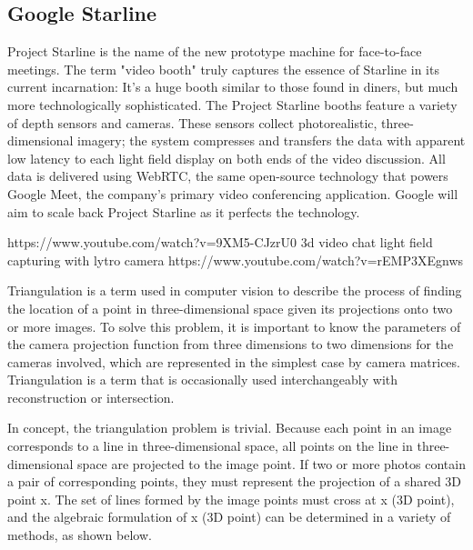  \subsection{Google Starline}\label{subsec2:google-starline}

Project Starline is the name of the new prototype machine for face-to-face meetings. The term "video booth" truly captures the essence of Starline in its current incarnation: It's a huge booth similar to those found in diners, but much more technologically sophisticated. The Project Starline booths feature a variety of depth sensors and cameras. These sensors collect photorealistic, three-dimensional imagery; the system compresses and transfers the data with apparent low latency to each light field display on both ends of the video discussion. All data is delivered using WebRTC, the same open-source technology that powers Google Meet, the company's primary video conferencing application. Google will aim to scale back Project Starline as it perfects the technology.

https://www.youtube.com/watch?v=9XM5-CJzrU0
3d video chat
light field capturing with lytro camera
https://www.youtube.com/watch?v=rEMP3XEgnws

Triangulation is a term used in computer vision to describe the process of finding the location of a point in three-dimensional space given its projections onto two or more images. To solve this problem, it is important to know the parameters of the camera projection function from three dimensions to two dimensions for the cameras involved, which are represented in the simplest case by camera matrices. Triangulation is a term that is occasionally used interchangeably with reconstruction or intersection.

In concept, the triangulation problem is trivial. Because each point in an image corresponds to a line in three-dimensional space, all points on the line in three-dimensional space are projected to the image point. If two or more photos contain a pair of corresponding points, they must represent the projection of a shared 3D point x. The set of lines formed by the image points must cross at x (3D point), and the algebraic formulation of x (3D point) can be determined in a variety of methods, as shown below.

